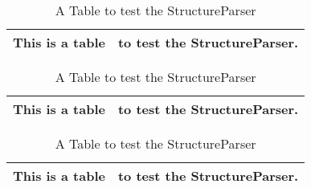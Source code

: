 %

%
%
%
%


\begin{table}
	\begin{center}\footnotesize
		\begin{tabular}{||c|c||}
			\hline
			This is a table & to test the StructureParser.\\
			\hline
			
			\hline
		\end{tabular}
	\end{center}
	\caption{A Table to test the StructureParser}
\end{table}

\begin{table}
	\begin{center}\footnotesize
		\begin{tabular}{||c|c||}
			\hline
			This is a table & to test the StructureParser.\\
			\hline
			
			\hline
		\end{tabular}
	\end{center}
	\caption{A Table to test the StructureParser}
\end{table}

\clearpage

\begin{table}
	\begin{center}\footnotesize
		\begin{tabular}{||c|c||}
			\hline
			This is a table & to test the StructureParser.\\
			\hline
			
			\hline
		\end{tabular}
	\end{center}
	\caption{A Table to test the StructureParser}
\end{table}

